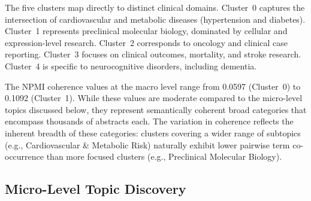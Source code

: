 \documentclass[a4paper,10pt,conference]{IEEEtran}
\begin{document}
\begin{table}[t]
\centering
\caption{Macro-level clinical validation of BioBERT KMeans clusters (K=5). Each cluster is labeled with a clinically meaningful disease category based on its top TF-IDF keywords.}
\label{tab:macro}
\end{table}

The five clusters map directly to distinct clinical domains. Cluster~0 captures the intersection of cardiovascular and metabolic diseases (hypertension and diabetes). Cluster~1 represents preclinical molecular biology, dominated by cellular and expression-level research. Cluster~2 corresponds to oncology and clinical case reporting. Cluster~3 focuses on clinical outcomes, mortality, and stroke research. Cluster~4 is specific to neurocognitive disorders, including dementia.

The NPMI coherence values at the macro level range from 0.0597 (Cluster~0) to 0.1092 (Cluster~1). While these values are moderate compared to the micro-level topics discussed below, they represent semantically coherent broad categories that encompass thousands of abstracts each. The variation in coherence reflects the inherent breadth of these categories: clusters covering a wider range of subtopics (e.g., Cardiovascular \& Metabolic Risk) naturally exhibit lower pairwise term co-occurrence than more focused clusters (e.g., Preclinical Molecular Biology).

\subsection{Micro-Level Topic Discovery}
\end{document}
